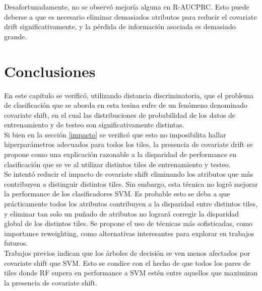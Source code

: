 Desafortunadamente, no se observó mejoría alguna en R-AUCPRC. Esto puede deberse a que es necesario eliminar demasiados atributos para reducir el covariate drift significativamente, y la pérdida de información asociada es demasiado grande. 


\section{Conclusiones}

En este capítulo se verificó, utilizando distancia discriminatoria, que el problema de clasificación que se aborda en esta tesina sufre de un fenómeno denominado covariate shift, en el cual las distribuciones de probabilidad de los datos de entrenamiento y de testeo son significativamente distintas. \\

Si bien en la sección \ref{impacto} se verificó que esto no imposibilita hallar hiperparámetros adecuados para todos los tiles, la presencia de covariate drift se propone como una explicación razonable a la disparidad de performance en clasificación que se ve al utilizar distintos tiles de entrenamiento y testeo. \\

Se intentó reducir el impacto de covariate shift eliminando los atributos que más contribuyen a distinguir distintos tiles. Sin embargo, esta técnica no logró mejorar la performance de los clasificadores SVM. Es probable esto se deba a que prácticamente todos los atributos contribuyen a la disparidad entre distintos tiles, y eliminar tan solo un puñado de atributos no logrará corregir la disparidad global de los distintos tiles. Se propone el uso de técnicas más sofisticadas, como importance reweighting, como alternativas interesantes para explorar en trabajos futuros. \\

Trabajos previos indican que los árboles de decisión se ven menos afectados por covariate shift que SVM. Esto se condice con el hecho de que todos los pares de tiles donde RF supera en performance a SVM estén entre aquellos que maximizan la presencia de covariate shift.